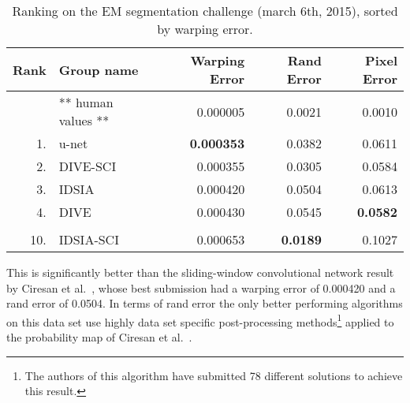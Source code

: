 \documentclass{llncs}
\begin{document}
\begin{table}[bp]
  \centering
  \caption{Ranking on the EM segmentation challenge \cite{em-segmentation-webpage} (march 6th, 2015), sorted by warping error.}
  \begin{tabular}{r@{~~~}l@{~~~}r@{~~~}r@{~~~}r}
    \toprule
Rank & Group name &	Warping Error &	Rand Error &	Pixel Error \\ 
\midrule
&** human values ** &	0.000005&	0.0021&	0.0010\\
1. & u-net &	\textbf{0.000353}&	0.0382&	0.0611\\
2. & DIVE-SCI& 	0.000355&	0.0305&	0.0584\\
3. & IDSIA \cite{schmidhuber12deepneural}&	0.000420&	0.0504&	0.0613\\
4. & DIVE &	0.000430&	0.0545&	\textbf{0.0582} \\
\\
10.& IDSIA-SCI& 	0.000653&	\textbf{0.0189}	& 0.1027 \\
\bottomrule
  \end{tabular}
  \label{tab:em-results}
\end{table}

This is significantly better than the sliding-window convolutional network result by Ciresan et al.~\cite{schmidhuber12deepneural}, whose best submission had a warping error of 	0.000420 and a rand error of 0.0504.
In terms of rand error the only better performing algorithms on this data set use highly data set specific post-processing methods\footnote{The authors of this algorithm have submitted 78 different solutions to achieve this result.} applied to the probability map of Ciresan et al.~\cite{schmidhuber12deepneural}.
\end{document}
